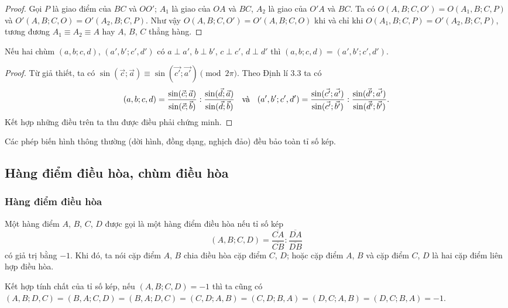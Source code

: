 \documentclass{article} %
\begin{document}
        \begin{proof}
            Gọi \(P\) là giao điểm của \(BC\) và \(OO'\); \(A_1\) là giao của \(OA\) và \(BC\), \(A_2\) là giao của \(O'A\) và \(BC\). Ta có \(O(A,B;C,O') = O(A_1,B;C,P)\) và \(O'(A,B;C,O) = O'(A_2,B;C,P)\). Như vậy \(O(A,B;C,O') = O'(A,B;C,O)\) khi và chỉ khi \(O(A_1,B;C,P) = O'(A_2,B;C,P)\), tương đương \(A_1 \equiv A_2 \equiv A\) hay \(A\), \(B\), \(C\) thẳng hàng.
        \end{proof}

        \begin{property}
            Nếu hai chùm \((a,b;c,d)\), \((a',b';c',d')\) có \(a \perp a'\), \(b \perp b'\), \(c \perp c'\), \(d \perp d'\) thì \((a,b;c,d) = (a',b';c',d')\).
        \end{property}

        \begin{proof}
            Từ giả thiết, ta có \(\sin(\vec{c};\vec{a}) \equiv \sin(\vec{c'};\vec{a'}) \pmod{2\pi}\). Theo Định lí 3.3 ta có
            \[(a,b;c,d) = \frac{\sin(\vec{c};\vec{a})}{\sin(\vec{c};\vec{b})} : \frac{\sin(\vec{d};\vec{a})}{\sin(\vec{d};\vec{b})} \hspace{0.2cm} \text{ và } \hspace{0.2cm} (a',b';c',d') = \frac{\sin(\vec{c'};\vec{a'})}{\sin(\vec{c'};\vec{b'})} : \frac{\sin(\vec{d'};\vec{a'})}{\sin(\vec{d'};\vec{b'})}.\]
            Kết hợp những điều trên ta thu được điều phải chứng minh.
        \end{proof}

        \begin{property}
            Các phép biến hình thông thường (dời hình, đồng dạng, nghịch đảo) đều bảo toàn tỉ số kép.  
        \end{property}

    \subsection{Hàng điểm điều hòa, chùm điều hòa}

    \subsubsection*{Hàng điểm điều hòa}

        \begin{definition}
            Một hàng điểm \(A\), \(B\), \(C\), \(D\) được gọi là một hàng điểm điều hòa nếu tỉ số kép \[(A,B;C,D) = \frac{\overline{CA}}{\overline{CB}} : \frac{\overline{DA}}{\overline{DB}}\] có giả trị bằng \(-1\). Khi đó, ta nói cặp điểm \(A\), \(B\) chia điều hòa cặp điểm \(C\), \(D\); hoặc cặp điểm \(A\), \(B\) và cặp điểm \(C\), \(D\) là hai cặp điểm liên hợp điều hòa.

            Kết hợp tính chất của tỉ số kép, nếu \((A,B;C,D) = -1\) thì ta cũng có \((A,B;D,C) = (B,A;C,D) = (B,A;D,C) = (C,D;A,B) = (C,D;B,A) = (D,C;A,B) = (D,C;B,A) = -1\).
        \end{definition}
\end{document}
